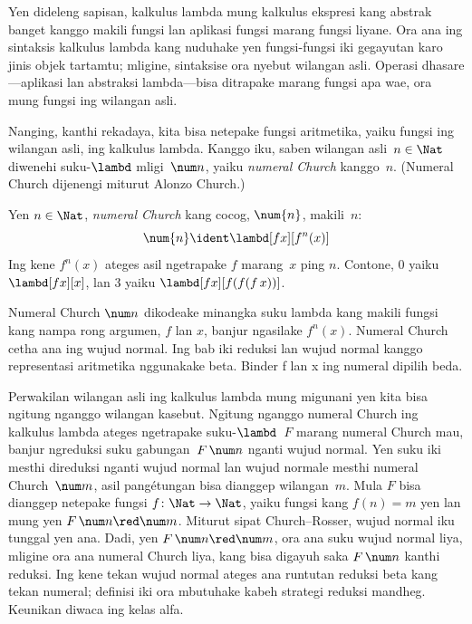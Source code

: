 \documentclass[../../../include/open-logic-section]{subfiles}
\begin{document}
%

Yen dideleng sapisan, kalkulus
lambda mung kalkulus ekspresi
kang abstrak banget kanggo
makili fungsi lan aplikasi
fungsi marang fungsi liyane.
Ora ana ing sintaksis
kalkulus lambda kang nuduhake
yen fungsi-fungsi iki gegayutan
karo jinis objek tartamtu;
mligine, sintaksise ora nyebut
wilangan asli.
Operasi dhasare---aplikasi
lan abstraksi lambda---bisa
ditrapake marang fungsi apa wae,
ora mung fungsi ing wilangan
asli.

Nanging, kanthi rekadaya,
kita bisa netepake fungsi
aritmetika, yaiku fungsi
ing wilangan asli, ing
kalkulus lambda.
Kanggo iku, saben wilangan
asli~$n \in \Nat$ diwenehi
suku-$\lambd$ mligi~$\num n$,
yaiku \emph{numeral Church}
kanggo~$n$.
(Numeral Church dijenengi
miturut Alonzo Church.)

\begin{defn}
  Yen $n \in \Nat$,
  \emph{numeral Church}
  kang cocog, $\num{n}$,
  makili~$n$:
  \[
    \num{n} \ident \lambd[fx][f^n(x)]
  \]
  Ing kene $f^n(x)$
  ateges asil ngetrapake
  $f$ marang~$x$
  ping $n$.
  Contone, $\num{0}$
  yaiku $\lambd[fx][x]$,
  lan $\num{3}$ yaiku
  $\lambd[fx][f(f(f\,x))]$.
\end{defn}
  
Numeral Church $\num n$
dikodeake minangka suku
lambda kang makili fungsi
kang nampa rong argumen,
$f$ lan $x$, banjur
ngasilake $f^n(x)$.
Numeral Church cetha
ana ing wujud normal. Ing bab iki reduksi lan wujud normal kanggo representasi aritmetika nggunakake beta. Binder f lan x ing numeral dipilih beda.

Perwakilan wilangan asli
ing kalkulus lambda
mung migunani yen kita
bisa ngitung nganggo
wilangan kasebut.
Ngitung nganggo numeral
Church ing kalkulus lambda
ateges ngetrapake
suku-$\lambd$~$F$ marang
numeral Church mau,
banjur ngreduksi suku
gabungan~$F\, \num n$
nganti wujud normal.
Yen suku iki mesthi
direduksi nganti wujud
normal lan wujud normale
mesthi numeral Church~$\num m$,
asil pangétungan bisa
dianggep wilangan~$m$.
Mula $F$ bisa dianggep
netepake fungsi
$f\colon \Nat \to \Nat$,
yaiku fungsi kang
$f(n) = m$ yen lan
mung yen $F\, \num n
\red \num m$.
Miturut sipat Church--Rosser,
wujud normal iku tunggal
yen ana. Dadi, yen
$F\, \num n \red \num m$,
ora ana suku wujud normal
liya, mligine ora ana
numeral Church liya,
kang bisa digayuh saka
$F \, \num n$ kanthi
reduksi. Ing kene tekan wujud normal ateges ana runtutan reduksi beta kang tekan numeral; definisi iki ora mbutuhake kabeh strategi reduksi mandheg. Keunikan diwaca ing kelas alfa.
\end{document}
